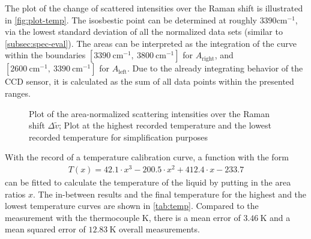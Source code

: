 The plot of the change of scattered intensities over the Raman shift is illustrated in \autoref{fig:plot-temp}. The isosbestic point can be determined at roughly $3390 \mathrm{cm^{-1}}$, via the lowest standard deviation of all the normalized data sets (similar to \autoref{subsec:spec-eval}). The areas can be interpreted as the integration of the curve within the boundaries $[3390~\mathrm{cm^{-1}},~3800~\mathrm{cm^{-1}}]$ for $A_\mathrm{right}$, and $[2600~\mathrm{cm^{-1}},~3390~\mathrm{cm^{-1}}]$ for $A_\mathrm{left}$. Due to the already integrating behavior of the CCD sensor, it is calculated as the sum of all data points within the presented ranges.

\begin{figure}[!htb]
    \centering
    
    \caption[Area-normalized Raman shift intensities for the lowest and highest temperatures]{Plot of the area-normalized scattering intensities over the Raman shift $\Delta \tilde{v}$; Plot at the highest recorded temperature and the lowest recorded temperature for simplification purposes} 
    \label{fig:plot-temp}
\end{figure}

With the record of a temperature calibration curve, a function with the form
\begin{align}
    T(x)=42.1 \cdot x^3 - 200.5 \cdot x^2 + 412.4 \cdot x -233.7
\end{align}
can be fitted to calculate the temperature of the liquid by putting in the area ratios $x$. The in-between results and the final temperature for the highest and the lowest temperature curves are shown in \autoref{tab:temp}. Compared to the measurement with the thermocouple K, there is a mean error of $3.46~\mathrm{K}$ and a mean squared error of $12.83~\mathrm{K}$ overall measurements.

